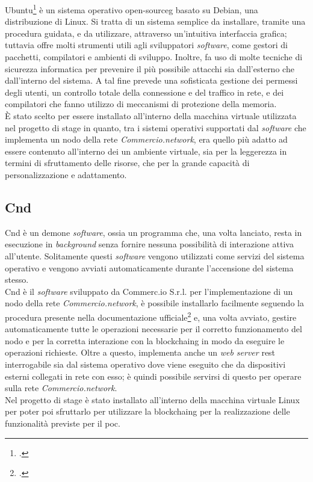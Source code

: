 Ubuntu\footcite{site:ubuntu} è un sistema operativo \gls{open-sourceg} basato su Debian, una distribuzione di Linux. Si tratta di un sistema semplice da installare, tramite una procedura guidata, e da utilizzare, attraverso un'intuitiva interfaccia grafica; tuttavia offre molti strumenti utili agli sviluppatori \textit{software}, come gestori di pacchetti, compilatori e ambienti di sviluppo. Inoltre, fa uso di molte tecniche di sicurezza informatica per prevenire il più possibile attacchi sia dall'esterno che dall'interno del sistema. A tal fine prevede una sofisticata gestione dei permessi degli utenti, un controllo totale della connessione e del traffico in rete, e dei compilatori che fanno utilizzo di meccanismi di protezione della memoria. \\
È stato scelto per essere installato all'interno della macchina virtuale utilizzata nel progetto di stage in quanto, tra i sistemi operativi supportati dal \textit{software} che implementa un nodo della rete \textit{Commercio.network}, era quello più adatto ad essere contenuto all'interno dei un ambiente virtuale, sia per la leggerezza in termini di sfruttamento delle risorse, che per la grande capacità di personalizzazione e adattamento.

\subsection*{Cnd}

Cnd è un demone \textit{software}, ossia un programma che, una volta lanciato, resta in esecuzione in \textit{background} senza fornire nessuna possibilità di interazione attiva all'utente. Solitamente questi \textit{software} vengono utilizzati come servizi del sistema operativo e vengono avviati automaticamente durante l'accensione del sistema stesso.\\
Cnd è il \textit{software} sviluppato da Commerc.io S.r.l. per l'implementazione di un nodo della rete \textit{Commercio.network}, è possibile installarlo facilmente seguendo la procedura presente nella documentazione ufficiale\footcite{manual:docs-commercio-network} e, una volta avviato, gestire automaticamente tutte le operazioni necessarie per il corretto funzionamento del nodo e per la corretta interazione con la \gls{blockchaing} in modo da eseguire le operazioni richieste. Oltre a questo, implementa anche un \textit{web server} \gls{rest}\glsfirstoccur{} interrogabile sia dal sistema operativo dove viene eseguito che da dispositivi esterni collegati in rete con esso; è quindi possibile servirsi di questo per operare sulla rete \textit{Commercio.network}.\\
Nel progetto di stage è stato installato all'interno della macchina virtuale Linux per poter poi sfruttarlo per utilizzare la \gls{blockchaing} per la realizzazione delle funzionalità previste per il \gls{poc}. 

